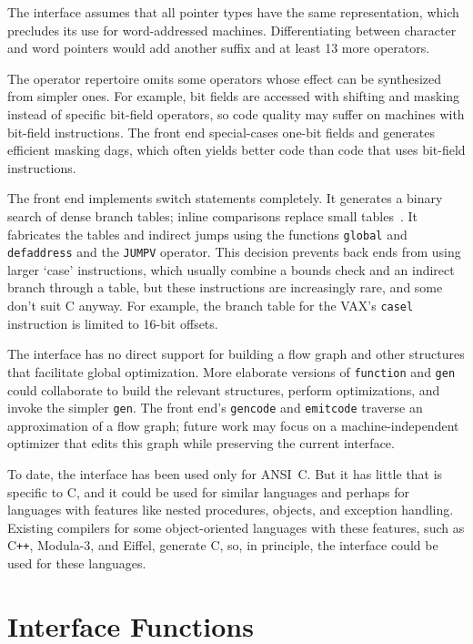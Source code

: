 The interface assumes that all pointer types have the same representation,
which precludes its use for word-addressed machines.
Differentiating between character and word pointers
would add another suffix and at least 13 more operators.

The operator repertoire omits some operators whose effect
can be synthesized from simpler ones.
For example, bit fields are accessed with shifting
and masking instead of specific bit-field operators, so
code quality may suffer on machines with bit-field instructions.
The front end special-cases one-bit fields
and generates efficient masking dags,
which often yields better code than code
that uses bit-field instructions.

The front end implements switch statements completely.
It generates a binary search of dense branch tables;
inline comparisons replace small tables~\cite{bernstein85}.
It fabricates the tables and indirect jumps
using the functions \verb|global| and \verb|defaddress|
and the \verb|JUMPV| operator.
This decision prevents back ends from using larger `case' instructions,
which usually combine a bounds check and an indirect branch through a table,
but these instructions are increasingly rare, and some don't suit C anyway.
For example, the branch table for the VAX's \verb|casel| instruction is limited
to 16-bit offsets.

The interface has no direct support for building
a flow graph and other structures that facilitate
global optimization. More elaborate versions of
\verb|function| and \verb|gen| could collaborate
to build the relevant structures, perform optimizations,
and invoke the simpler \verb|gen|.
The front end's \verb|gencode| and \verb|emitcode| traverse
an approximation of a flow graph; future work may focus on
a machine-independent optimizer that edits
this graph while preserving the current interface.

To date, the interface has been used only for ANSI~C.
But it has little that is specific to C, and it could be used for
similar languages and perhaps for languages with features like nested
procedures, objects, and exception handling.
Existing compilers for some object-oriented languages with these features,
such as C\verb|++|, Modula-3, and Eiffel, generate C, so, in principle,
the interface could be used for these languages.



\appendix

\section{Interface Functions}
\label{appendix:interface}

